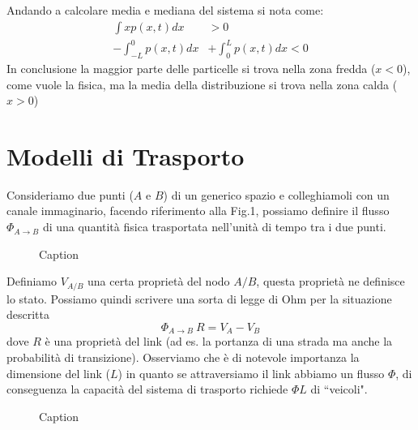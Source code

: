 \documentclass[12pt, a4paper]{article}
\theoremstyle{theorem}
\begin{document}
			Andando a calcolare media e mediana del sistema si nota come:
			\begin{equation}
				\begin{split}
					\int xp(x,t)dx&>0\\
					-\int_{-L}^0p(x,t)dx&+\int_0^Lp(x,t)dx<0
				\end{split}
			\end{equation}
			In conclusione la maggior parte delle particelle si trova nella zona fredda ($x<0$), come vuole la fisica, ma la media della distribuzione si trova nella zona calda ($x>0$)
	\section{Modelli di Trasporto}
		Consideriamo due punti ($A$ e $B$) di un generico spazio e colleghiamoli con un canale immaginario, facendo riferimento alla Fig.1, possiamo definire il flusso $\Phi_{A \rightarrow B}$ di una quantità fisica trasportata nell'unità di tempo tra i due punti.
		\begin{figure}[ht!]
    			\centering
    			\caption{Caption}
		\end{figure}
		Definiamo $V_{A/B}$ una certa proprietà del nodo $A/B$, questa proprietà ne definisce lo stato. Possiamo quindi scrivere una sorta di legge di Ohm per la situazione descritta 
		\begin{equation}
    			\Phi_{A \rightarrow B} \ R = V_A - V_B
		\end{equation} dove $R$ è una proprietà del link (ad es. la portanza di una strada ma anche la probabilità di transizione).
		Osserviamo che è di notevole importanza la dimensione del link ($L$) in quanto se attraversiamo il link abbiamo un flusso $\Phi$, di conseguenza la capacità del sistema di trasporto richiede $\Phi L$ di “veicoli".			
		\begin{figure}[ht!]
    			\centering
    			\caption{Caption}
		\end{figure}
\end{document}
